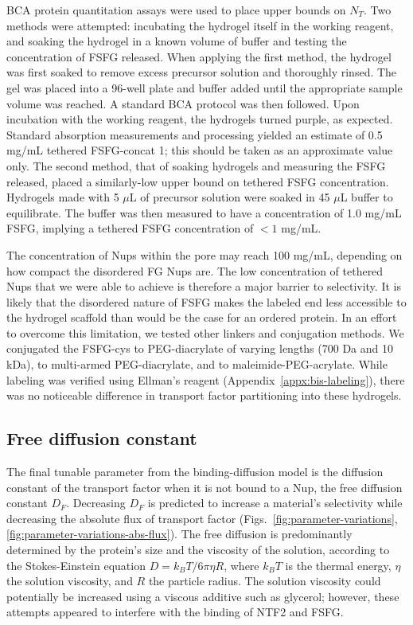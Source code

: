  BCA protein quantitation assays were used to place upper bounds on $N_T$.  Two methods were attempted: incubating the hydrogel itself in the working reagent, and soaking the hydrogel in a known volume of buffer and testing the concentration of FSFG released.  When applying the first method, the hydrogel was first soaked to remove excess precursor solution and thoroughly rinsed.  The gel was placed into a 96-well plate and buffer added until the appropriate sample volume was reached.  A standard BCA protocol was then followed.  Upon incubation with the working reagent, the hydrogels turned purple, as expected.  Standard absorption measurements and processing yielded an estimate of 0.5 mg/mL tethered FSFG-concat 1; this should be taken as an approximate value only.  The second method, that of soaking hydrogels and measuring the FSFG released, placed a similarly-low upper bound on tethered FSFG concentration.  Hydrogels made with 5 $\mu$L of precursor solution were soaked in 45 $\mu$L buffer to equilibrate.  The buffer was then measured to have a concentration of 1.0 mg/mL FSFG, implying a tethered FSFG concentration of $<1$ mg/mL.

The concentration of Nups within the pore may reach 100 mg/mL, depending on how compact the disordered FG Nups are.  The low concentration of tethered Nups that we were able to achieve is therefore a major barrier to selectivity.  It is likely that the disordered nature of FSFG makes the labeled end less accessible to the hydrogel scaffold than would be the case for an ordered protein.  In an effort to overcome this limitation, we tested other linkers and conjugation methods.  We conjugated the FSFG-cys to PEG-diacrylate of varying lengths (700 Da and 10 kDa), to multi-armed PEG-diacrylate, and to maleimide-PEG-acrylate.  While labeling was verified using Ellman's reagent (Appendix~\ref{appx:bis-labeling}), there was no noticeable difference in transport factor partitioning into these hydrogels.

\subsection{Free diffusion constant}

The final tunable parameter from the binding-diffusion model is the diffusion constant of the transport factor when it is not bound to a Nup, the free diffusion constant $D_F$.  Decreasing $D_F$ is predicted to increase a material's selectivity while decreasing the absolute flux of transport factor (Figs.~\ref{fig:parameter-variations}, \ref{fig:parameter-variations-abs-flux}).  The free diffusion is predominantly determined by the protein's size and the viscosity of the solution, according to the Stokes-Einstein equation $D = k_BT/6\pi\eta R$, where $k_BT$ is the thermal energy, $\eta$ the solution viscosity, and $R$ the particle radius.  The solution viscosity could potentially be increased using a viscous additive such as glycerol; however, these attempts appeared to interfere with the binding of NTF2 and FSFG.

